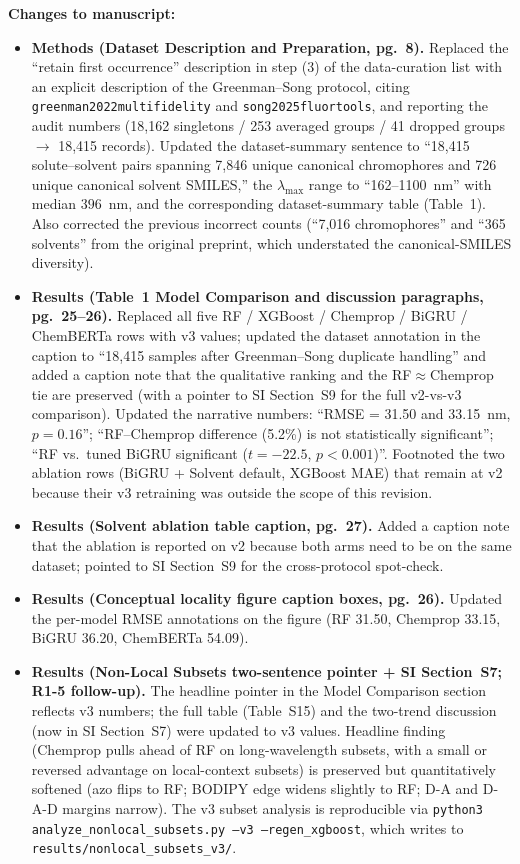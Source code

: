 \documentclass[11pt]{article}
\newenvironment{changes}{%
  \noindent\textbf{Changes to manuscript:}
  \begin{itemize}[leftmargin=2em,itemsep=2pt]}{%
  \end{itemize}\medskip}
\begin{document}
\begin{changes}
  \item \textbf{Methods (Dataset Description and Preparation, pg.\ 8).} Replaced the ``retain first occurrence'' description in step (3) of the data-curation list with an explicit description of the Greenman--Song protocol, citing \texttt{greenman2022multifidelity} and \texttt{song2025fluortools}, and reporting the audit numbers (18{,}162 singletons / 253 averaged groups / 41 dropped groups $\to$ 18{,}415 records). Updated the dataset-summary sentence to ``18{,}415 solute--solvent pairs spanning 7{,}846 unique canonical chromophores and 726 unique canonical solvent SMILES,'' the $\lambda_{\max}$ range to ``162--1100~nm'' with median $396$~nm, and the corresponding dataset-summary table (Table~1). Also corrected the previous incorrect counts (``7{,}016 chromophores'' and ``365 solvents'' from the original preprint, which understated the canonical-SMILES diversity).
  \item \textbf{Results (Table~1 Model Comparison and discussion paragraphs, pg.\ 25--26).} Replaced all five RF / XGBoost / Chemprop / BiGRU / ChemBERTa rows with v3 values; updated the dataset annotation in the caption to ``18,415 samples after Greenman--Song duplicate handling'' and added a caption note that the qualitative ranking and the RF$\approx$Chemprop tie are preserved (with a pointer to SI Section~S9 for the full v2-vs-v3 comparison). Updated the narrative numbers: ``RMSE = 31.50 and 33.15~nm, $p = 0.16$''; ``RF--Chemprop difference (5.2\%) is not statistically significant''; ``RF vs.\ tuned BiGRU significant ($t = -22.5$, $p < 0.001$)''. Footnoted the two ablation rows (BiGRU + Solvent default, XGBoost MAE) that remain at v2 because their v3 retraining was outside the scope of this revision.
  \item \textbf{Results (Solvent ablation table caption, pg.\ 27).} Added a caption note that the ablation is reported on v2 because both arms need to be on the same dataset; pointed to SI Section~S9 for the cross-protocol spot-check.
  \item \textbf{Results (Conceptual locality figure caption boxes, pg.\ 26).} Updated the per-model RMSE annotations on the figure (RF 31.50, Chemprop 33.15, BiGRU 36.20, ChemBERTa 54.09).
 \item \textbf{Results (Non-Local Subsets two-sentence pointer + SI Section~S7; R1-5 follow-up).} The headline pointer in the Model Comparison section reflects v3 numbers; the full table (Table~S15) and the two-trend discussion (now in SI Section~S7) were updated to v3 values. Headline finding (Chemprop pulls ahead of RF on long-wavelength subsets, with a small or reversed advantage on local-context subsets) is preserved but quantitatively softened (azo flips to RF; BODIPY edge widens slightly to RF; D-A and D-A-D margins narrow). The v3 subset analysis is reproducible via \texttt{python3 analyze\_nonlocal\_subsets.py --v3 --regen\_xgboost}, which writes to \texttt{results/nonlocal\_subsets\_v3/}.

\end{changes}
\end{document}
